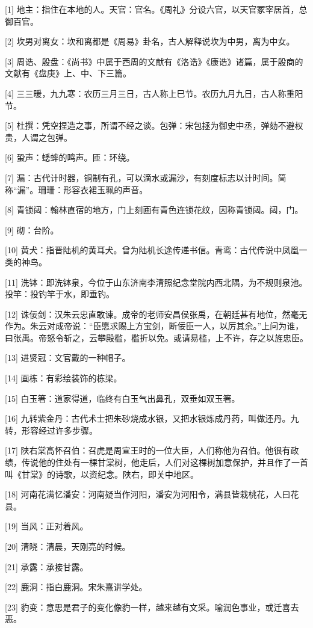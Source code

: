 \documentclass[12pt,UTF8]{ctexbook}
\begin{document}
[1] 地主：指住在本地的人。天官：官名。《周礼》分设六官，以天官冢宰居首，总御百官。

[2] 坎男对离女：坎和离都是《周易》卦名，古人解释说坎为中男，离为中女。

[3] 周诰、殷盘：《尚书》中属于西周的文献有《洛诰》《康诰》诸篇，属于殷商的文献有《盘庚》上、中、下三篇。

[4] 三三暖，九九寒：农历三月三日，古人称上巳节。农历九月九日，古人称重阳节。

[5] 杜撰：凭空捏造之事，所谓不经之谈。包弹：宋包拯为御史中丞，弹劾不避权贵，人谓之包弹。

[6] 蛩声：蟋蟀的鸣声。匝：环绕。

[7] 漏：古代计时器，铜制有孔，可以滴水或漏沙，有刻度标志以计时间。简称“漏”。珊珊：形容衣裙玉珮的声音。

[8] 青锁闼：翰林直宿的地方，门上刻画有青色连锁花纹，因称青锁闼。闼，门。

[9] 砌：台阶。

[10] 黄犬：指晋陆机的黄耳犬。曾为陆机长途传递书信。青鸾：古代传说中凤凰一类的神鸟。

[11] 洗钵：即洗钵泉，今位于山东济南李清照纪念堂院内西北隅，为不规则泉池。投竿：投钓竿于水，即垂钓。

[12] 诛佞剑：汉朱云忠直敢谏。成帝的老师安昌侯张禹，在朝廷甚有地位，然毫无作为。朱云对成帝说：“臣愿求赐上方宝剑，断佞臣一人，以厉其余。”上问为谁，曰张禹。帝怒令斩之，云攀殿槛，槛折以免。或请易槛，上不许，存之以旌忠臣。

[13] 进贤冠：文官戴的一种帽子。

[14] 画栋：有彩绘装饰的栋梁。

[15] 白玉箸：道家得道，临终有白玉气出鼻孔，双垂如双玉箸。

[16] 九转紫金丹：古代术士把朱砂烧成水银，又把水银炼成丹药，叫做还丹。九转，形容经过许多步骤。

[17] 陕右棠高怀召伯：召虎是周宣王时的一位大臣，人们称他为召伯。他很有政绩，传说他的住处有一棵甘棠树，他走后，人们对这棵树加意保护，并且作了一首叫《甘棠》的诗歌，以资纪念。陕右，即关中地区。

[18] 河南花满忆潘安：河南疑当作河阳，潘安为河阳令，满县皆栽桃花，人曰花县。

[19] 当风：正对着风。

[20] 清晓：清晨，天刚亮的时候。

[21] 承露：承接甘露。

[22] 鹿洞：指白鹿洞。宋朱熹讲学处。

[23] 豹变：意思是君子的变化像豹一样，越来越有文采。喻润色事业，或迁喜去恶。
\end{document}
